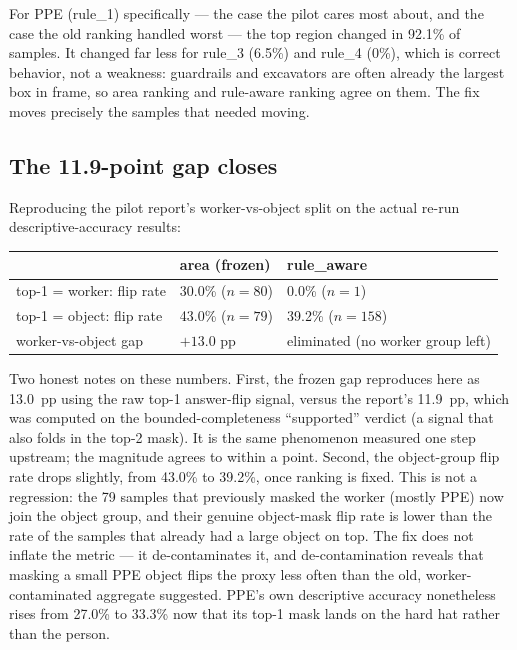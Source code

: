For PPE (rule\_1) specifically --- the case the pilot cares most about, and the case the old ranking
handled worst --- the top region changed in 92.1\% of samples. It changed far less for rule\_3
(6.5\%) and rule\_4 (0\%), which is correct behavior, not a weakness: guardrails and excavators are
often already the largest box in frame, so area ranking and rule-aware ranking agree on them. The
fix moves precisely the samples that needed moving.

\subsection{The 11.9-point gap closes}

Reproducing the pilot report's worker-vs-object split on the actual re-run descriptive-accuracy
results:

\begin{center}
\begin{tabular}{p{4.4cm}p{4.4cm}p{4.4cm}}
\toprule
\textbf{} & \textbf{area (frozen)} & \textbf{rule\_aware} \\
\midrule
top-1 = worker: flip rate & 30.0\% ($n{=}80$) & 0.0\% ($n{=}1$) \\
top-1 = object: flip rate & 43.0\% ($n{=}79$) & 39.2\% ($n{=}158$) \\
worker-vs-object gap & $+13.0$ pp & eliminated (no worker group left) \\
\bottomrule
\end{tabular}
\label{tab:p11-gap}
\end{center}

Two honest notes on these numbers. First, the frozen gap reproduces here as 13.0~pp using the raw
top-1 answer-flip signal, versus the report's 11.9~pp, which was computed on the bounded-completeness
``supported'' verdict (a signal that also folds in the top-2 mask). It is the same phenomenon
measured one step upstream; the magnitude agrees to within a point. Second, the object-group flip
rate drops slightly, from 43.0\% to 39.2\%, once ranking is fixed. This is not a regression: the 79
samples that previously masked the worker (mostly PPE) now join the object group, and their genuine
object-mask flip rate is lower than the rate of the samples that already had a large object on top.
The fix does not inflate the metric --- it de-contaminates it, and de-contamination reveals that
masking a small PPE object flips the proxy less often than the old, worker-contaminated aggregate
suggested. PPE's own descriptive accuracy nonetheless rises from 27.0\% to 33.3\% now that its top-1
mask lands on the hard hat rather than the person.

